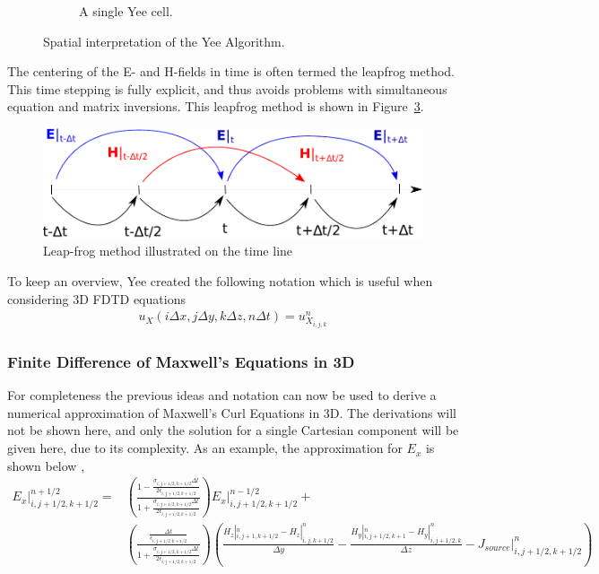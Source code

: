 \begin{figure}
\begin{subfigure}[b]{0.49\textwidth}
        \caption{A single Yee cell.}
        \label{fig:yee-cell}
    \end{subfigure}
    \caption{Spatial interpretation of the Yee Algorithm.}
    \label{fig:space-yee-algorithm}
\end{figure}

The centering of the E- and H-fields in time is often termed the leapfrog method. This time stepping is fully explicit, and thus avoids problems with simultaneous equation and matrix inversions. This leapfrog method is shown in Figure~\ref{fig:leap_frog}. 

\begin{figure}[htbp]
    \centering
    \includegraphics[scale=0.7]{img/analysis/leap_frog}
    \caption{Leap-frog method illustrated on the time line}
    \label{fig:leap_frog}
\end{figure}

To keep an overview, Yee created the following notation which is useful when considering 3D FDTD equations
\begin{align}
  u_X (i \Delta x , j \Delta y, k \Delta z, n \Delta t) = u^n_{X_{i,j,k}}
\end{align}

\subsubsection{Finite Difference of Maxwell's Equations in 3D}
For completeness the previous ideas and notation can now be used to derive a numerical approximation of Maxwell's Curl Equations in 3D. The derivations will not be shown here, and only the solution for a single Cartesian component will be given here, due to its complexity. As an example, the approximation for $E_x$ is shown below \cite{taflove2000computional},
\begin{align}
  E_x |^{n+1/2}_{i,j+1/2,k+1/2} =& \left( \frac{1-\frac{\sigma_{i,j+1/2,k+1/2} \Delta t}{2\epsilon_{i,j+1/2,k+1/2}}}{1+\frac{\sigma_{i,j+1/2,k+1/2} \Delta t}{2\epsilon_{i,j+1/2,k+1/2}}} \right) E_x |^{n-1/2}_{i,j+1/2,k+1/2}  + \\ 
  &\left(  \frac{\frac{\Delta t}{\epsilon_{i,j+1/2,k+1/2}}}{1+\frac{\sigma_{i,j+1/2,k+1/2} \Delta t}{2\epsilon_{i,j+1/2,k+1/2}} }    \right) \left( \frac{H_z |^n_{i,j+1,k+1/2} - H_z |^n_{i,j,k+1/2} }{\Delta y} - \frac{H_y |^n_{i,j+1/2,k+1} - H_y |^n_{i,j+1/2,k} }{\Delta z} -J_{source}|^n_{i,j+1/2,k+1/2}  \right)
\end{align}

